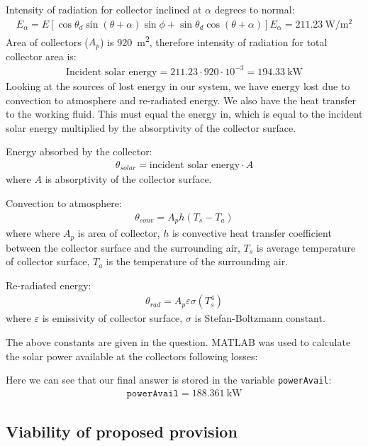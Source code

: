 \documentclass[11pt]{article}
\numberwithin{equation}{section}
\begin{document}
Intensity of radiation for collector inclined at $\alpha$ degrees to normal:
\begin{gather}
    E_{\alpha} = E\left[\cos \theta_d \sin\left(\theta + \alpha\right)\sin\phi + \sin\theta_d \cos\left(\theta + \alpha\right)\right]
    E_{\alpha} = \SI{211.23}{\watt\per\square\meter}
\end{gather}
Area of collectors ($A_p$) is \SI{920}{\meter\squared}, therefore intensity of radiation for total collector area is:
\begin{gather}
    \textrm{Incident solar energy} = 211.23\cdot920\cdot10^{-3} = \SI{194.33}{\kilo\watt}
\end{gather}
Looking at the sources of lost energy in our system, we have energy lost due to convection to atmosphere and re-radiated energy. We also have the heat transfer to the working fluid. This must equal the energy in, which is equal to the incident solar energy multiplied by the absorptivity of the collector surface.

Energy absorbed by the collector:
\begin{gather}
    \theta_{solar} = \textrm{incident solar energy} \cdot A
\end{gather}
where $A$ is absorptivity of the collector surface.

Convection to atmosphere:
\begin{gather}
    \theta_{conv} = A_ph\left(T_s - T_a\right)
\end{gather}
where where $A_p$ is area of collector, $h$ is convective heat transfer coefficient between the collector surface and the surrounding air, $T_s$ is average temperature of collector surface, $T_a$ is the temperature of the surrounding air. 

Re-radiated energy:
\begin{gather}
    \theta_{rad} = A_p \varepsilon\sigma\left(T_s^4\right)
\end{gather}
where $\varepsilon$ is emissivity of collector surface, $\sigma$ is Stefan-Boltzmann constant.

The above constants are given in the question. MATLAB was used to calculate the solar power available at the collectors following losses:

Here we can see that our final answer is stored in the variable \texttt{powerAvail}:
\begin{gather}
    \texttt{powerAvail} = \SI{188.361}{\kilo\watt}
\end{gather}
\subsection{Viability of proposed provision}
\end{document}
